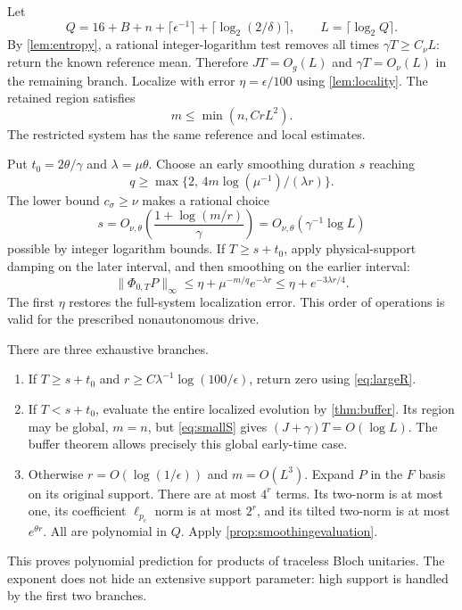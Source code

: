 \documentclass[11pt,reqno]{amsart}
\numberwithin{equation}{section}
\theoremstyle{definition}
\theoremstyle{remark}
\newcommand{\nn}[1]{\lVert#1\rVert}
\begin{document}
Let
\begin{equation}\label{eq:Q}
 Q=16+B+n+\lceil\epsilon^{-1}\rceil+\lceil\log_2(2/\delta)\rceil,
 \qquad L=\lceil\log_2 Q\rceil.
\end{equation}
By \cref{lem:entropy}, a rational integer-logarithm test removes all times $\gamma T\geq C_\nu L$: return the known reference mean. Therefore $JT=O_g(L)$ and $\gamma T=O_\nu(L)$ in the remaining branch. Localize with error $\eta=\epsilon/100$ using \cref{lem:locality}. The retained region satisfies
\begin{equation}\label{eq:mr}
 m\leq\min(n,CrL^2).
\end{equation}
The restricted system has the same reference and local estimates.

Put $t_0=2\theta/\gamma$ and $\lambda=\mu\theta$. Choose an early smoothing duration $s$ reaching
\[
 q\geq\max\{2,\,4m\log(\mu^{-1})/(\lambda r)\}.
\]
The lower bound $c_\sigma\geq\nu$ makes a rational choice
\begin{equation}\label{eq:smallS}
 s=O_{\nu,\theta}\!\left(\frac{1+\log(m/r)}\gamma\right)
 =O_{\nu,\theta}(\gamma^{-1}\log L)
\end{equation}
possible by integer logarithm bounds. If $T\geq s+t_0$, apply physical-support damping on the later interval, and then smoothing on the earlier interval:
\begin{equation}\label{eq:largeR}
 \nn{\Phi_{0,T}P}_\infty
 \leq\eta+\mu^{-m/q}e^{-\lambda r}
 \leq\eta+e^{-3\lambda r/4}.
\end{equation}
The first $\eta$ restores the full-system localization error. This order of operations is valid for the prescribed nonautonomous drive.

There are three exhaustive branches.
\begin{enumerate}
\item If $T\geq s+t_0$ and $r\geq C\lambda^{-1}\log(100/\epsilon)$, return zero using \eqref{eq:largeR}.
\item If $T<s+t_0$, evaluate the entire localized evolution by \cref{thm:buffer}. Its region may be global, $m=n$, but \eqref{eq:smallS} gives $(J+\gamma)T=O(\log L)$. The buffer theorem allows precisely this global early-time case.
\item Otherwise $r=O(\log(1/\epsilon))$ and $m=O(L^3)$. Expand $P$ in the $F$ basis on its original support. There are at most $4^r$ terms. Its two-norm is at most one, its coefficient $\ell_{p_c}$ norm is at most $2^r$, and its tilted two-norm is at most $e^{\theta r}$. All are polynomial in $Q$. Apply \cref{prop:smoothingevaluation}.
\end{enumerate}
This proves polynomial prediction for products of traceless Bloch unitaries. The exponent does not hide an extensive support parameter: high support is handled by the first two branches.
\end{document}
